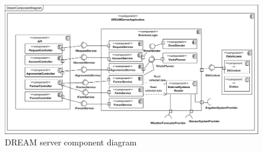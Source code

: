 \begin{figure}[H]
    \centering
    \includegraphics[scale=0.58, origin=c]
    {diagrams/component/BackendComponents.png}
    \caption{DREAM server component diagram}
    \label{fig:backend-components}
\end{figure}

